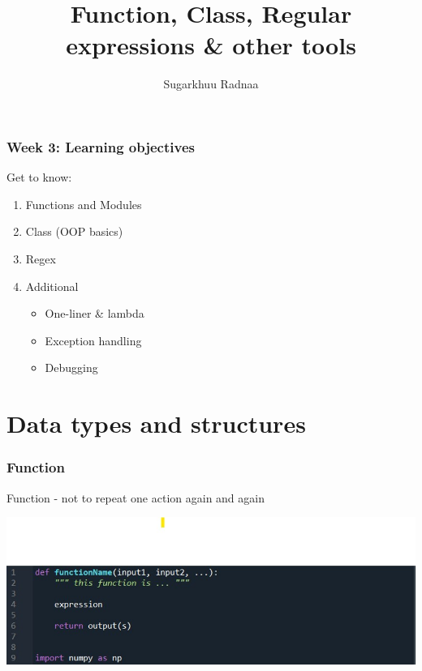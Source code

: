 \documentclass{beamer}
\title[Introduction to Python]{Function, Class, Regular expressions \& other tools}
\author{Sugarkhuu Radnaa}
\institute[]
{
Py4Econ in Ulaanbaatar \\ 
\medskip
\textit{py4econ@gmail.com} 
}
\date{}  %
\begin{document}
\begin{frame}
\titlepage %
\end{frame}

\begin{frame}
    \frametitle{Week 3: Learning objectives}
    Get to know: 
    \begin{enumerate}
        \item Functions and Modules
        \item Class (OOP basics)
        \item Regex 
        \item Additional
        \begin{itemize}
            \item One-liner & lambda
            \item Exception handling
            \item Debugging
        \end{itemize}         
    \end{enumerate}
\end{frame}

\section{Data types and structures} 

\begin{frame}
\frametitle{Function}
Function - not to repeat one action again and again
    \begin{center}
        \includegraphics[scale=0.5]{figures/function.jpg}
    \end{center}        
\end{frame}
\end{document}
